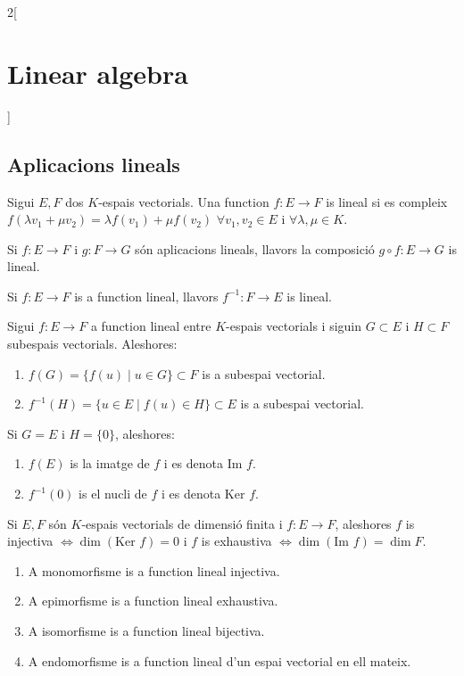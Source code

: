 \documentclass[../../../main.tex]{subfiles}
\begin{document}
\begin{multicols}{2}[\section{Linear algebra}]
\subsection{Aplicacions lineals}
\begin{definition}
Sigui $E,F$ dos $K$-espais vectorials. Una function $f:E\rightarrow F$ is lineal si es compleix $f(\lambda v_1+\mu v_2)=\lambda f(v_1)+\mu f(v_2)$ $\forall v_1,v_2\in E$ i $\forall\lambda,\mu\in K$.
\end{definition}
\begin{prop}
Si $f:E\rightarrow F$ i $g:F\rightarrow G$ són aplicacions lineals, llavors la composició $g\circ f:E\rightarrow G$ is lineal.
\end{prop}
\begin{prop}
Si $f:E\rightarrow F$ is a function lineal, llavors $f^{-1}:F\rightarrow E$ is lineal.
\end{prop}
\begin{prop}
Sigui $f:E\rightarrow F$ a function lineal entre $K$-espais vectorials i siguin $G\subset E$ i $H\subset F$ subespais vectorials. Aleshores:
\begin{enumerate}
    \item $f(G)=\{f(u)\mid u\in G\}\subset F$ is a subespai vectorial.
    \item $f^{-1}(H)=\{u\in E\mid f(u)\in H\}\subset E$ is a subespai vectorial.
\end{enumerate}
Si $G=E$ i $H=\{0\}$, aleshores:
\begin{enumerate}
    \item $f(E)$ is la imatge de $f$ i es denota $\text{Im }f$.
    \item $f^{-1}(0)$ is el nucli de $f$ i es denota $\text{Ker }f$.
\end{enumerate}
\end{prop}
\begin{prop}
Si $E,F$ són $K$-espais vectorials de dimensió finita i $f:E\rightarrow F$, aleshores $f$ is injectiva $\iff \dim(\text{Ker }f)=0$ i $f$ is exhaustiva $\iff \dim(\text{Im }f)=\dim F$.
\end{prop}
\begin{definition}
\hfill
\begin{enumerate}
    \item A monomorfisme is a function lineal injectiva.
    \item A epimorfisme is a function lineal exhaustiva.
    \item A isomorfisme is a function lineal bijectiva.
    \item A endomorfisme is a function lineal d'un espai vectorial en ell mateix.

\end{enumerate}
\end{definition}
\end{multicols}
\end{document}
